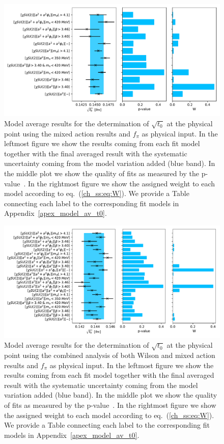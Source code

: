 {\begin{figure}
    \centering
    \includegraphics[width=1.\textwidth]{./cap5/figs/BMA_SU2_tm.pdf}
    \caption{Model average results for the determination of $\sqrt{t_0}$ at the physical point using the mixed action results and $f_{\pi}$ as physical input. In the leftmost figure we show the results coming from each fit model together with the final averaged result with the systematic uncertainty coming from the model variation added (blue band). In the middle plot we show the quality of fits as measured by the p-value~\citep{Bruno:2022mfy}. In the rightmost figure we show the assigned weight to each model according to eq.~(\ref{ch_ss:eq:W}). We provide a Table connecting each label to the corresponding fit models in Appendix~\ref{apex_model_av_t0}.}
    \label{ch_ss:fig:BMA_tm_SU2}
\end{figure}

\begin{figure}
    \centering
    \includegraphics[width=1.\textwidth]{./cap5/figs/BMA_SU2_comb.pdf}
    \caption{Model average results for the determination of $\sqrt{t_0}$ at the physical point using the combined analysis of both Wilson and mixed action results and $f_{\pi}$ as physical input. In the leftmost figure we show the results coming from each fit model together with the final averaged result with the systematic uncertainty coming from the model variation added (blue band). In the middle plot we show the quality of fits as measured by the p-value~\citep{Bruno:2022mfy}. In the rightmost figure we show the assigned weight to each model according to eq.~(\ref{ch_ss:eq:W}). We provide a Table connecting each label to the corresponding fit models in Appendix~\ref{apex_model_av_t0}.}
    \label{ch_ss:fig:BMA_comb_SU2}
\end{figure}

}
